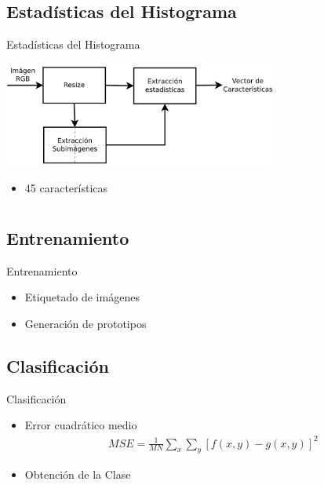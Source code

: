 \documentclass[spanish]{beamer}
\begin{document}
\subsection{Estadísticas del Histograma}
\begin{frame}{Estadísticas del Histograma}
 \begin{center} \includegraphics[width=9cm]{../diagramas/procesoestadisticas} \end{center}
  \begin{itemize}
  \item 45 características
  \end{itemize}
\end{frame}

\section[Método]{}
\subsection{Entrenamiento}
\begin{frame}{Entrenamiento}
  \begin{itemize}
  \item Etiquetado de imágenes
  \item Generación de prototipos
  \end{itemize}
\end{frame}
\subsection{Clasificación}
\begin{frame}{Clasificación}
  \begin{itemize}
  \item Error cuadrático medio
    \begin{align*}
      MSE = \frac{1}{MN} \sum_x\sum_y [ f(x,y) - g(x,y) ]^{2}
    \end{align*}
  \item Obtención de la Clase
  \end{itemize}
\end{frame}
\end{document}
